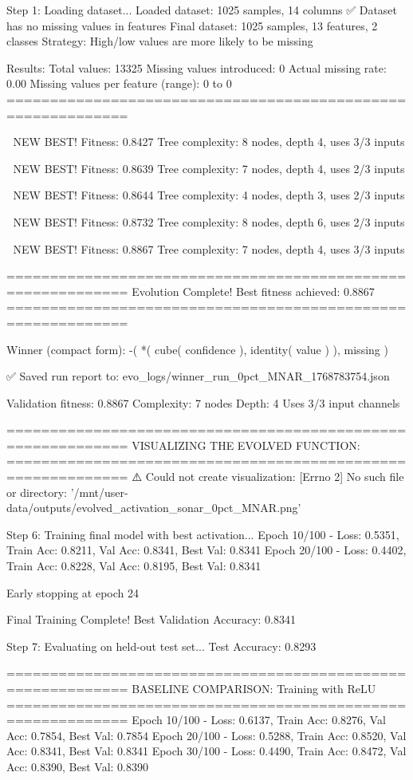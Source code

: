 Step 1: Loading dataset...
Loaded dataset: 1025 samples, 14 columns
✅ Dataset has no missing values in features
Final dataset: 1025 samples, 13 features, 2 classes
Strategy: High/low values are more likely to be missing

Results:
  Total values: 13325
  Missing values introduced: 0
  Actual missing rate: 0.00%
  Missing values per feature (range): 0 to 0
============================================================


🎯 NEW BEST! Fitness: 0.8427
Tree complexity: 8 nodes, depth 4, uses 3/3 inputs

🎯 NEW BEST! Fitness: 0.8639
Tree complexity: 7 nodes, depth 4, uses 2/3 inputs

🎯 NEW BEST! Fitness: 0.8644
Tree complexity: 4 nodes, depth 3, uses 2/3 inputs

🎯 NEW BEST! Fitness: 0.8732
Tree complexity: 8 nodes, depth 6, uses 2/3 inputs

🎯 NEW BEST! Fitness: 0.8867
Tree complexity: 7 nodes, depth 4, uses 3/3 inputs

============================================================
Evolution Complete!
Best fitness achieved: 0.8867
============================================================

Winner (compact form):
 -(
  *(
    cube(
      confidence
    ),
    identity(
      value
    )
  ),
  missing
)

✅ Saved run report to: evo_logs/winner_run_0pct_MNAR_1768783754.json

Validation fitness: 0.8867
Complexity: 7 nodes
Depth: 4
Uses 3/3 input channels

============================================================
VISUALIZING THE EVOLVED FUNCTION:
============================================================
⚠️ Could not create visualization: [Errno 2] No such file or directory: '/mnt/user-data/outputs/evolved_activation_sonar_0pct_MNAR.png'

Step 6: Training final model with best activation...
Epoch  10/100 - Loss: 0.5351, Train Acc: 0.8211, Val Acc: 0.8341, Best Val: 0.8341
Epoch  20/100 - Loss: 0.4402, Train Acc: 0.8228, Val Acc: 0.8195, Best Val: 0.8341

Early stopping at epoch 24

Final Training Complete!
Best Validation Accuracy: 0.8341

Step 7: Evaluating on held-out test set...
Test Accuracy: 0.8293

============================================================
BASELINE COMPARISON: Training with ReLU
============================================================
Epoch  10/100 - Loss: 0.6137, Train Acc: 0.8276, Val Acc: 0.7854, Best Val: 0.7854
Epoch  20/100 - Loss: 0.5288, Train Acc: 0.8520, Val Acc: 0.8341, Best Val: 0.8341
Epoch  30/100 - Loss: 0.4490, Train Acc: 0.8472, Val Acc: 0.8390, Best Val: 0.8390

